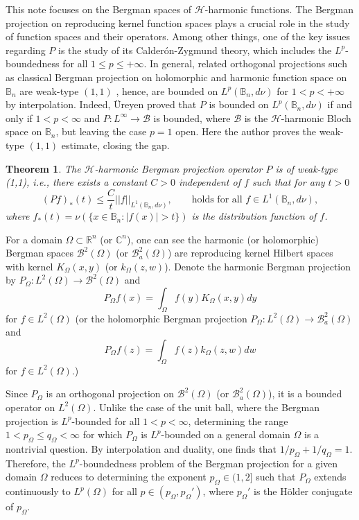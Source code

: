 \documentclass[12pt]{amsart}
\newtheorem{theorem}{Theorem}[section]
\theoremstyle{definition}
\theoremstyle{remark}
\newcommand{\R}{\mathbb{R}}
\newcommand{\C}{\mathbb{C}}
\newcommand{\B}{\mathbb{B}}
\begin{document}
This note focuses on the Bergman spaces of $\mathcal{H}$-harmonic functions. 
The Bergman projection on reproducing kernel function spaces plays a crucial role in the study of function spaces and their operators. 
Among other things, one of the key issues regarding $P $ is the study of its Calder\'{o}n-Zygmund theory, which includes the $L^p$-boundedness for all $1\leqslant p\leqslant+\infty$. 
In general, related orthogonal projections such as classical Bergman projection on holomorphic and harmonic function space on $\B_n$ are weak-type $(1,1)$ \cite{DHZZ2001}, hence, are bounded on $L^p(\B_n,d\nu)$ for $1<p<+\infty$ by interpolation. 
Indeed, \"Ureyen \cite{Ureyen2023} proved that $P$ is bounded on $L^p(\B_n,d\nu)$ if and only if $1<p<\infty$ and $P:L^\infty\to \mathcal{B}$ is bounded, where $\mathcal{B}$ is the $\mathcal{H}$-harmonic Bloch space on $\B_n$, but leaving the case $p=1$ open. Here the author proves the weak-type $(1,1)$ estimate, closing the gap.
\begin{theorem}\label{th1.1}
	The $\mathcal{H}$-harmonic Bergman projection operator $P$ is of weak-type (1,1), i.e., there exists a constant $C>0$ independent of $f$ such that for any $t>0$
	\begin{equation}\label{equ1.2}
		(P f)_*(t)\leqslant\frac{C}{t}||f||_{L^1(\B_n,d\nu)}, \qquad \text{holds for all $f\in L^1(\B_n,d\nu)$},
	\end{equation}
		where $f_*(t)=\nu (\{x\in\B_n:|f(x)|>t\})$
		is the distribution function of $f$.
\end{theorem}
For a domain $\Omega\subset\R^n$ (or $\C^n$), one can see the harmonic (or holomorphic) Bergman spaces $\mathcal{B}^2(\Omega)$ (or $\mathcal{B}_a^2(\Omega)$) are reproducing kernel Hilbert spaces with kernel $K_\Omega(x,y)$ (or $k_\Omega(z,w)$).
Denote the harmonic Bergman projection by $P_\Omega: L^2(\Omega)\rightarrow\mathcal{B}^2(\Omega)$ and 
\[
	P_\Omega f(x)=\int_\Omega f(y)K_\Omega(x,y) dy
\]
for $f\in L^2(\Omega)$
(or the holomorphic Bergman projection $P_\Omega: L^2(\Omega)\rightarrow\mathcal{B}_a^2(\Omega)$ and 
\[
	P_\Omega f(z)=\int_\Omega f(z)k_\Omega(z,w) dw
\]
for $f\in L^2(\Omega)$.)

Since $P_\Omega$ is an orthogonal projection on $\mathcal{B}^2(\Omega)$ (or $\mathcal{B}_a^2(\Omega)$), it is a bounded operator on $L^2(\Omega)$. Unlike the case of the unit ball, where the Bergman projection is $L^p$-bounded for all $1<p<\infty$, determining the range $1 < p_\Omega \leqslant q_\Omega < \infty$ for which $P_\Omega$ is $L^p$-bounded on a general domain $\Omega$ is a nontrivial question. By interpolation and duality, one finds that $1/p_\Omega + 1/q_\Omega = 1$. Therefore, the $L^p$-boundedness problem of the Bergman projection for a given domain $\Omega$ reduces to determining the exponent $p_\Omega \in (1,2]$ such that $P_\Omega$ extends continuously to $L^p(\Omega)$ for all $p \in (p_\Omega, p_\Omega')$, where $p_\Omega'$ is the Hölder conjugate of $p_\Omega$. 
\end{document}
